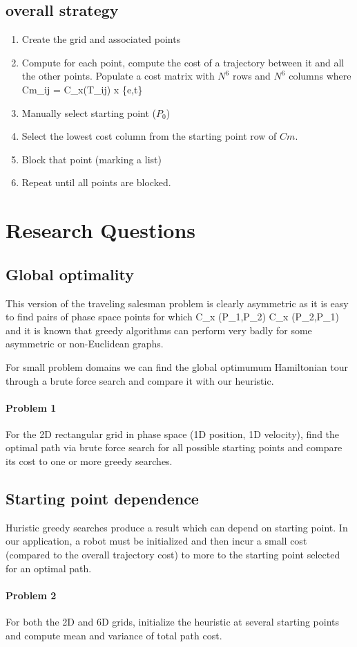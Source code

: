 \documentclass[letterpaper]{article}
\begin{document}
\subsection{overall strategy}

\begin{enumerate}
  \item Create the grid and associated points
  \item Compute for each point, compute the cost of a trajectory between it and all the other points.  Populate
  a cost matrix with $N^6$ rows and $N^6$ columns where
  \beq
    Cm_{ij} = C_x(T_{ij})  \qquad    x \in \{e,t\}
  \eeq
  \item Manually select starting point ($P_0$)
  \item Select the lowest cost column from the starting point row of $Cm$.
  \item Block that point (marking a list)
  \item Repeat until all points are blocked.
\end{enumerate}


\section{Research Questions}


\subsection{Global optimality}\label{prob:global}

This version of the traveling salesman problem is clearly asymmetric as it is
easy to find pairs of phase space points for which
\beq
C_x (P_1,P_2) \neq C_x (P_2,P_1)
\eeq
and it is known \cite{}  that greedy algorithms can perform very badly
for some asymmetric or non-Euclidean graphs.

For small problem domains we can find the global optimumum Hamiltonian tour
through a brute force search and compare it with our heuristic.

\paragraph{Problem 1}
For the 2D rectangular grid in phase space (1D position, 1D velocity),
find the optimal path via brute force search for all possible starting points
and compare its cost to
one or more greedy searches.

\subsection{Starting point dependence}\label{prob:startingpt}
Huristic greedy searches produce a result which can depend on starting point.
In our application, a robot must be initialized and then incur a small cost
(compared to the overall trajectory cost) to more to the starting point
selected for an optimal path.

\paragraph{Problem 2}
For both the 2D and 6D grids, initialize the heuristic at several starting
points and compute
mean and variance of total path cost.
\end{document}
